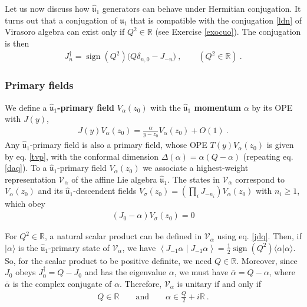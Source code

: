 \documentclass[12pt, a4paper, notitlepage, twoside]{report}
\numberwithin{equation}{section}
\theoremstyle{break}
\begin{document}
Let us now discuss how $\hat{\mathfrak{u}}_1$ generators can behave under Hermitian conjugation.
It turns out that a conjugation of $\hat{\mathfrak{u}}_1$ that is compatible with the conjugation \eqref{ldn} of Virasoro algebra  can exist only if $Q^2\in\mathbb{R}$ (see Exercise \ref{exocuo}). 
The conjugation is then 
\begin{align}
 J_n^\dagger = \operatorname{sign}(Q^2)\big( Q\delta_{n,0}-J_{-n} \big)\ ,\qquad (Q^2\in\mathbb{R}) \ .
\label{jdq}
\end{align}

\subsubsection{Primary fields}

We define a \textbf{\boldmath $\hat{\mathfrak{u}}_1$-primary field} $V_{\alpha}(z_0)$ with the \textbf{\boldmath $\hat{\mathfrak{u}}_1$ momentum} $\alpha$ by its OPE with $J(y)$,
\begin{align}
 \boxed{J(y) V_\alpha(z_0) = \frac{\alpha}{y-z_0} V_\alpha(z_0) + O(1)}\ .
\label{jva}
\end{align}
Any $\hat{\mathfrak{u}}_1$-primary field is also a primary field, whose OPE $T(y)V_\alpha(z_0)$ is given by eq. \eqref{tvp}, with the conformal dimension $\Delta(\alpha) = \alpha(Q-\alpha)$ (repeating eq. \eqref{daq}).
To a $\hat{\mathfrak{u}}_1$-primary field $V_\alpha(z_0)$ we associate a highest-weight representation $\mathcal{V}_\alpha$ of the  affine Lie algebra $\hat{\mathfrak{u}}_1$.
The states in $\mathcal{V}_\alpha$ correspond to $V_\alpha(z_0)$ and its $\hat{\mathfrak{u}}_1$-descendent fields $V_\sigma(z_0)=\left(\prod_i J_{-n_i}\right) V_\alpha(z_0)$ with $n_i\geq 1$, which obey 
\begin{align}
 \left(J_0 - \alpha\right) V_\sigma(z_0) = 0
\label{jma}
\end{align}

For $Q^2\in\mathbb{R}$, 
a natural scalar product can be defined in $\mathcal{V}_\alpha$ using eq. \eqref{jdq}.
Then, if $|\alpha\rangle$ is the $\hat{\mathfrak{u}}_1$-primary state of $\mathcal{V}_\alpha$, we have $\left< J_{-1}\alpha\middle|J_{-1}\alpha\right> = \frac12 \operatorname{sign}(Q^2) \langle \alpha|\alpha\rangle$.
So, for the scalar product to be positive definite, we need $Q\in \mathbb{R}$.
Moreover, since $J_0$ obeys $J_0^\dagger = Q-J_0$ and has the eigenvalue $\alpha$, we must have $\bar\alpha = Q-\alpha$, where $\bar \alpha$ is the complex conjugate of $\alpha$.
Therefore, $\mathcal{V}_\alpha$ is unitary if and only if
\begin{align}
 Q\in\mathbb{R} \qquad \text{and} \qquad \alpha \in \frac{Q}{2} + i{\mathbb{R}}\ .
\label{aif}
\end{align}
\end{document}
